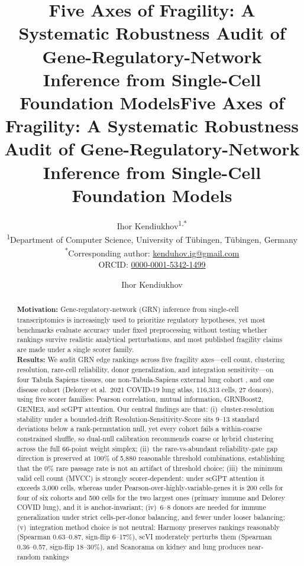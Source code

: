 \documentclass[12pt]{article}
\title{\textbf{Five Axes of Fragility: A Systematic Robustness Audit of Gene-Regulatory-Network Inference from Single-Cell Foundation Models}}
\author{Ihor Kendiukhov\textsuperscript{1,*} \\[6pt]
\small\textsuperscript{1}Department of Computer Science, University of T{\"u}bingen, T{\"u}bingen, Germany \\
\small\textsuperscript{*}Corresponding author: \href{mailto:kenduhov.ig@gmail.com}{kenduhov.ig@gmail.com} \\
\small ORCID: \href{https://orcid.org/0000-0001-5342-1499}{0000-0001-5342-1499}
}
\date{}
\begin{document}
\title{Five Axes of Fragility: A Systematic Robustness Audit of Gene-Regulatory-Network Inference from Single-Cell Foundation Models}

\author{Ihor Kendiukhov}









\begin{abstract}\textbf{Motivation:}
Gene-regulatory-network (GRN) inference from single-cell transcriptomics is
increasingly used to prioritize regulatory hypotheses, yet most benchmarks
evaluate accuracy under fixed preprocessing without testing whether rankings
survive realistic analytical perturbations, and most published fragility claims
are made under a single scorer family.\\
\textbf{Results:}
We audit GRN edge rankings across five fragility axes---cell count,
clustering resolution, rare-cell reliability, donor generalization, and
integration sensitivity---on four Tabula Sapiens tissues, one
non-Tabula-Sapiens external lung cohort \citep[SmartSeq2;][]{Travaglini2020},
and one disease cohort (Delorey et al.\ 2021 COVID-19
lung atlas, 116{,}313 cells, 27 donors), using five scorer families:
Pearson correlation, mutual information, GRNBoost2, GENIE3, and
scGPT attention.
Our central findings are that:
(i)~cluster-resolution stability under a bounded-drift
Resolution-Sensitivity-Score sits 9--13 standard deviations below a
rank-permutation null, yet every cohort fails a within-coarse
constrained shuffle, so dual-null calibration recommends coarse or
hybrid clustering across the full 66-point weight simplex;
(ii)~the rare-vs-abundant reliability-gate gap direction is preserved
at 100\% of 5{,}880 reasonable threshold combinations, establishing
that the 0\% rare passage rate is not an artifact of threshold choice;
(iii)~the minimum valid cell count (MVCC) is strongly scorer-dependent:
under scGPT attention it exceeds 3{,}000 cells, whereas under
Pearson-over-highly-variable-genes it is 200 cells for four of six
cohorts and 500 cells for the two largest ones (primary immune and
Delorey COVID lung), and it is anchor-invariant;
(iv)~6--8 donors are needed for immune generalization under strict
cells-per-donor balancing, and fewer under looser balancing;
(v)~integration method choice is not neutral: Harmony preserves
rankings reasonably (Spearman 0.63--0.87, sign-flip 6--17\%), scVI
moderately perturbs them (Spearman 0.36--0.57, sign-flip 18--30\%),
and Scanorama on kidney and lung produces near-random rankings

\end{abstract}
\end{document}
